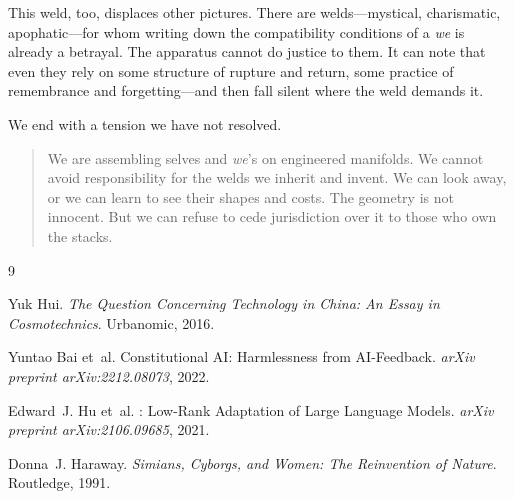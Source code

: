 This weld, too, displaces other pictures. There are welds---mystical, charismatic, apophatic---for whom writing down the compatibility conditions of a \emph{we} is already a betrayal. The apparatus cannot do justice to them. It can note that even they rely on some structure of rupture and return, some practice of remembrance and forgetting---and then fall silent where the weld demands it.

We end with a tension we have not resolved.

\begin{quote}
We are assembling selves and \emph{we}'s on engineered manifolds. We cannot avoid responsibility for the welds we inherit and invent. We can look away, or we can learn to see their shapes and costs. The geometry is not innocent. But we can refuse to cede jurisdiction over it to those who own the stacks.
\end{quote}


\begin{thebibliography}{9}

Yuk Hui.
\newblock \emph{The Question Concerning Technology in China: An Essay in Cosmotechnics}.
\newblock Urbanomic, 2016.

Yuntao Bai et~al.
\newblock Constitutional {AI}: Harmlessness from {AI}-Feedback.
\newblock \emph{arXiv preprint arXiv:2212.08073}, 2022.

Edward~J. Hu et~al.
: Low-Rank Adaptation of Large Language Models.
\newblock \emph{arXiv preprint arXiv:2106.09685}, 2021.

Donna~J. Haraway.
\newblock \emph{Simians, Cyborgs, and Women: The Reinvention of Nature}.
\newblock Routledge, 1991.

\end{thebibliography}
